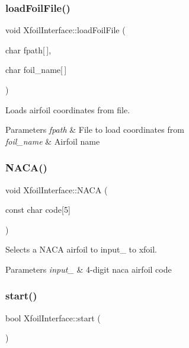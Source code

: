 \subsubsection{\texorpdfstring{load\+Foil\+File()}{LoadFoilFile()}}
{\footnotesize\ttfamily void Xfoil\+Interface\+::load\+Foil\+File (\begin{DoxyParamCaption}\item[{char}]{fpath\mbox{[}$\,$\mbox{]},  }\item[{char}]{foil_name\mbox{[}$\,$\mbox{]} }\end{DoxyParamCaption})}



Loads airfoil coordinates from file. 


\begin{DoxyParams}{Parameters}
{\em fpath} & File to load coordinates from \\
\hline
{\em foil_name} & Airfoil name \\
\hline
\end{DoxyParams}
\mbox{\label{classXfoilInterface_a202072a14053054a55501c45a296bce7}} 
\subsubsection{\texorpdfstring{N\+A\+C\+A()}{NACA()}}
{\footnotesize\ttfamily void Xfoil\+Interface\+::\+N\+A\+CA (\begin{DoxyParamCaption}\item[{const char}]{code\mbox{[}5\mbox{]} }\end{DoxyParamCaption})}



Selects a N\+A\+CA airfoil to input_ to xfoil.


\begin{DoxyParams}{Parameters}
{\em input_} & 4-\/digit naca airfoil code \\
\hline
\end{DoxyParams}
\mbox{\label{classXfoilInterface_aba502bd5accaf23d3bdf342a82d5fb7f}} 
\subsubsection{\texorpdfstring{start()}{Start()}}
{\footnotesize\ttfamily bool Xfoil\+Interface\+::start (\begin{DoxyParamCaption}{ }\end{DoxyParamCaption})}



